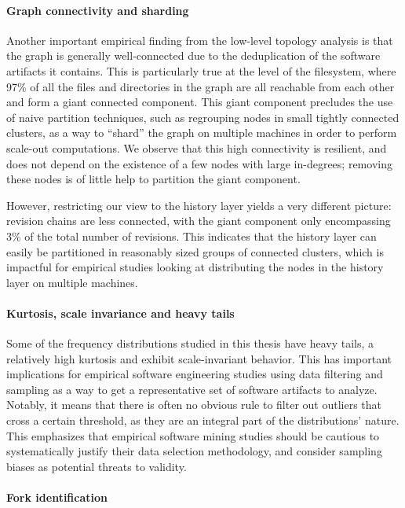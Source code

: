 \paragraph*{Graph connectivity and sharding}

Another important empirical finding from the low-level topology analysis is
that the graph is generally well-connected due to the deduplication of the
software artifacts it contains. This is particularly true at the level of the
filesystem, where 97\% of all the files and directories in the graph are all
reachable from each other and form a giant connected component. This giant
component precludes the use of naive partition techniques, such as regrouping
nodes in small tightly connected clusters, as a way to ``shard'' the graph on
multiple machines in order to perform scale-out computations. We observe that
this high connectivity is resilient, and does not depend on the existence of a
few nodes with large in-degrees; removing these nodes is of little help to
partition the giant component.

However, restricting our view to the history layer yields a very different
picture: revision chains are less connected, with the giant component only
encompassing 3\% of the total number of revisions. This indicates that the
history layer can easily be partitioned in reasonably sized groups of connected
clusters, which is impactful for empirical studies looking at distributing the
nodes in the history layer on multiple machines.

\paragraph*{Kurtosis, scale invariance and heavy tails}

Some of the frequency distributions studied in this thesis have heavy tails,
a relatively high kurtosis and exhibit scale-invariant behavior. This has
important implications for empirical software engineering studies using data
filtering and sampling as a way to get a representative set of software
artifacts to analyze. Notably, it means that there is often no obvious rule to
filter out outliers that cross a certain threshold, as they are an integral
part of the distributions' nature. This emphasizes that empirical software
mining studies should be cautious to systematically justify their data
selection methodology, and consider sampling biases as potential threats to
validity.

\paragraph*{Fork identification}

